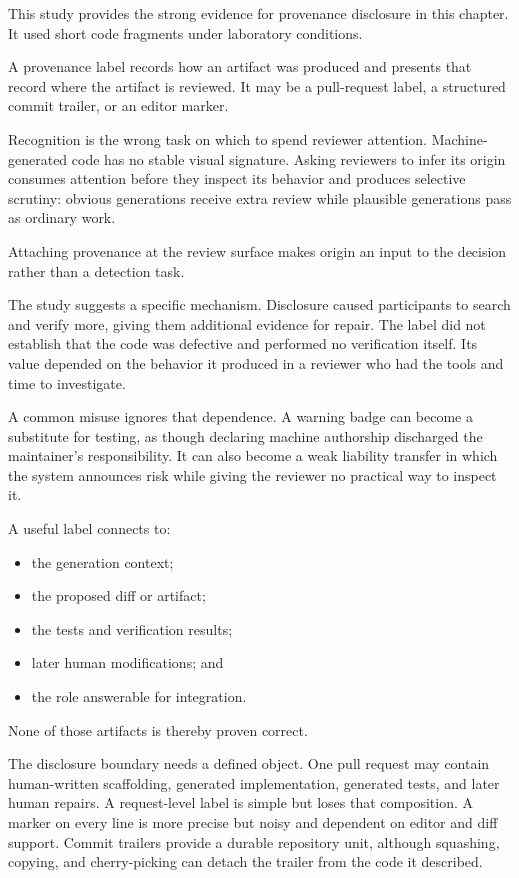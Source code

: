 This study provides the strong evidence for provenance disclosure in this chapter. It used short code fragments under laboratory conditions.

A provenance label records how an artifact was produced and presents that record where the artifact is reviewed. It may be a pull-request label, a structured commit trailer, or an editor marker.

Recognition is the wrong task on which to spend reviewer attention. Machine-generated code has no stable visual signature. Asking reviewers to infer its origin consumes attention before they inspect its behavior and produces selective scrutiny: obvious generations receive extra review while plausible generations pass as ordinary work.

Attaching provenance at the review surface makes origin an input to the decision rather than a detection task.

The study suggests a specific mechanism. Disclosure caused participants to search and verify more, giving them additional evidence for repair. The label did not establish that the code was defective and performed no verification itself. Its value depended on the behavior it produced in a reviewer who had the tools and time to investigate.

A common misuse ignores that dependence. A warning badge can become a substitute for testing, as though declaring machine authorship discharged the maintainer's responsibility. It can also become a weak liability transfer in which the system announces risk while giving the reviewer no practical way to inspect it.

A useful label connects to:

\begin{itemize}
\tightlist
\item
  the generation context;
\item
  the proposed diff or artifact;
\item
  the tests and verification results;
\item
  later human modifications; and
\item
  the role answerable for integration.
\end{itemize}

None of those artifacts is thereby proven correct.

The disclosure boundary needs a defined object. One pull request may contain human-written scaffolding, generated implementation, generated tests, and later human repairs. A request-level label is simple but loses that composition. A marker on every line is more precise but noisy and dependent on editor and diff support. Commit trailers provide a durable repository unit, although squashing, copying, and cherry-picking can detach the trailer from the code it described.


